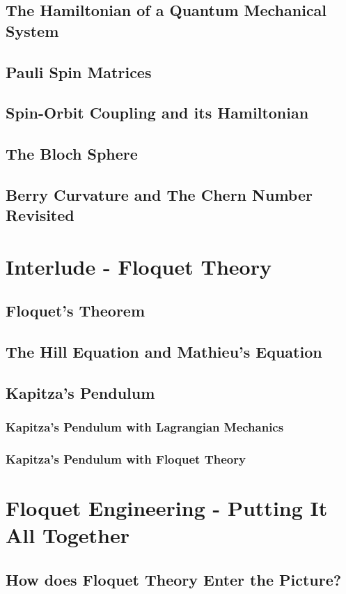 \documentclass[a4paper]{article}
\begin{document}
    \subsection{The Hamiltonian of a Quantum Mechanical System}
    \subsection{Pauli Spin Matrices}
    \subsection{Spin-Orbit Coupling and its Hamiltonian}
    \subsection{The Bloch Sphere}
    \subsection{Berry Curvature and The Chern Number Revisited}
    \section{Interlude - Floquet Theory}
    \subsection{Floquet's Theorem}
    \subsection{The Hill Equation and Mathieu's Equation}
    \subsection{Kapitza's Pendulum}
    \subsubsection{Kapitza's Pendulum with Lagrangian Mechanics}
    \subsubsection{Kapitza's Pendulum with Floquet Theory}
    \section{Floquet Engineering - Putting It All Together}
    \subsection{How does Floquet Theory Enter the Picture?}
\end{document}
